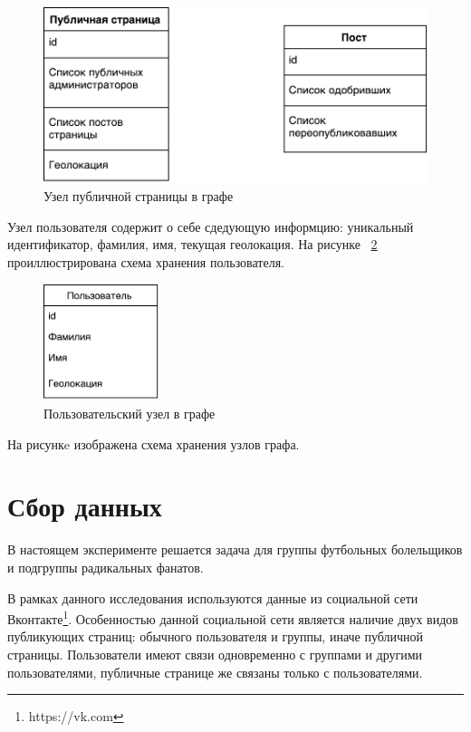 \documentclass[annotation,times,page4]{itmo-student-thesis}
\begin{document}
\begin{figure}[!h]
\caption{Узел публичной страницы в графе}
\label{fig:public}
\centering
\includegraphics[width=\textwidth]{figs/public.pdf}
\end{figure}

Узел пользователя содержит о себе сдедующую информцию: уникальный идентификатор, фамилия, имя, текущая геолокация. На рисунке ~\ref{fig:user} проиллюстрирована схема хранения пользователя.

\begin{figure}[!h]
\caption{Пользовательский узел в графе}
\label{fig:user}
\centering
\includegraphics[width=0.3\textwidth]{figs/user.pdf}
\end{figure}


На рисункe изображена схема хранения узлов графа.    

\section{Сбор данных}
В настоящем эксперименте решается задача для группы футбольных болельщиков и подгруппы радикальных фанатов.

В рамках данного исследования используются данные из социальной сети Вконтакте\footnote{https://vk.com}. Особенностью данной социальной сети является наличие двух видов публикующих страниц: обычного пользователя и группы, иначе публичной страницы. Пользователи имеют связи одновременно с группами и другими пользователями, публичные странице же связаны только с пользователями. 
\end{document}
